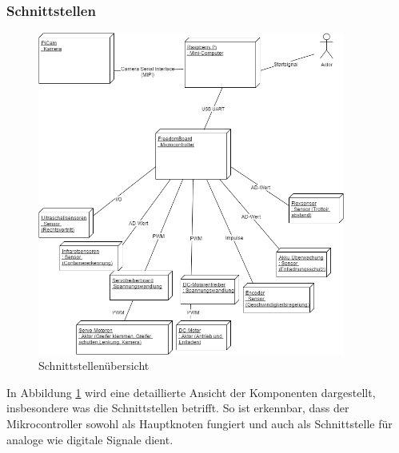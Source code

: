 \subsubsection{Schnittstellen}
\begin{figure}[H]%
\centering
\includegraphics[width=0.9\textwidth]{03_Loesungskonzept/pictures/Verteilungsdiagramm.png}
\caption{Schnittstellenübersicht}
\label{fig:Verteilungsdiagramm}
\end{figure}\flushleft
In Abbildung \ref{fig:Verteilungsdiagramm} wird eine detaillierte Ansicht der Komponenten dargestellt, insbesondere was die Schnittstellen betrifft. So ist erkennbar, dass der Mikrocontroller sowohl als Hauptknoten fungiert und auch als Schnittstelle für analoge wie digitale Signale dient.
